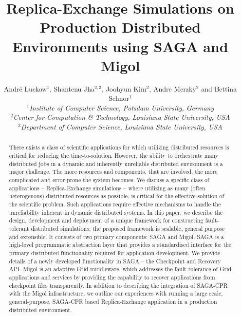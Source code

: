 \documentclass[times, 10pt, twocolumn]{article}
\title{Replica-Exchange Simulations on Production Distributed
  Environments using SAGA and Migol}
\author{
  Andr\'e Luckow$^{1}$, Shantenu Jha$^{2,3}$, Joohyun Kim$^{2}$, Andre Merzky$^{2}$ and Bettina Schnor$^{1}$\\
  \small{\emph{$^{1}$Institute of Computer Science, Potsdam University, Germany}}\\
  \small{\emph{$^{2}$Center for Computation \& Technology, Louisiana State University, USA}}\\
  \small{\emph{$^{3}$Department of Computer Science, Louisiana State University, USA}}\\
}
\begin{document}
 


\maketitle    

\begin{abstract}
  There exists a class of scientific applications for which utilizing
  distributed resources is critical for reducing the
  time-to-solution. However, the ability to orchestrate many
  distributed jobs in a dynamic and inherently unreliable distributed
  environment is a major challenge. The more resources and components,
  that are involved, %
  the more complicated and error-prone the system becomes. We discuss
  a specific class of applications -- Replica-Exchange simulations
  -- where utilizing as many (often heterogenous) distributed
  resources as possible, is critical for the effective solution of the
  scientific problem. Such applications require effective mechanisms
  to handle the unreliability inherent in dynamic distributed systems.
  In this paper, we describe the design, development and deployment of
  a unique framework for constructing fault-tolerant distributed
  simulations; %
  the proposed framework is scalable, general purpose and
  extensible. It consists of two primary components: SAGA and Migol.
  SAGA is a high-level programmatic abstraction layer that provides a
  standardised interface for the primary distributed functionality
  required for application development. We provide details of a newly
  developed functionality in SAGA -- the Checkpoint and Recovery
  API. Migol is an adaptive Grid middleware, which addresses the fault
  tolerance of Grid applications and services by providing the
  capability to recover applications from checkpoint files
  transparently.  In addition to describing
  the integration of SAGA-CPR with the Migol infrastructure, 
  we outline our experiences with
  running a large scale, general-purpose, SAGA-CPR based
  Replica-Exchange application in a production distributed
  environment.

    

\end{abstract}
\end{document}
